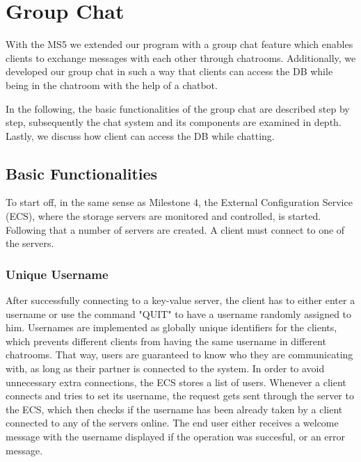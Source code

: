 \section{Group Chat}
\label{sec:groupchat}
With the MS5 we extended our program with a group chat feature which enables clients to exchange messages with each other through chatrooms. Additionally, we developed our group chat in such a way that clients can access the DB while being in the chatroom with the help of a chatbot.
 
In the following, the basic functionalities of the group chat are described step by step, subsequently the chat system and its components are examined in depth. Lastly, we discuss how client can access the DB while chatting.

\subsection{Basic Functionalities}
\label{sec:groupchat_functionalities}
To start off, in the same sense as Milestone 4, the External Configuration Service (ECS), where the storage servers are monitored and controlled, is started. Following that a number of servers are created. A client must connect to one of the servers.

\subsubsection{Unique Username}
\label{sec:groupchat_funtionalities_uniqueusername}
After successfully connecting to a key-value server, the client has to either enter a username or use the command "QUIT" to have a username randomly assigned to him. Usernames are implemented as globally unique identifiers for the clients, which prevents different clients from having the same username in different chatrooms. That way, users are guaranteed to know who they are communicating with, as long as their partner is connected to the system.
In order to avoid unnecessary extra connections, the ECS stores a list of users. Whenever a client connects and tries to set its username, the request gets sent through the server to the ECS, which then checks if the username has been already taken by a client connected to any of the servers online. The end user either receives a welcome message with the username displayed if the operation was succesful, or an error message.
 

